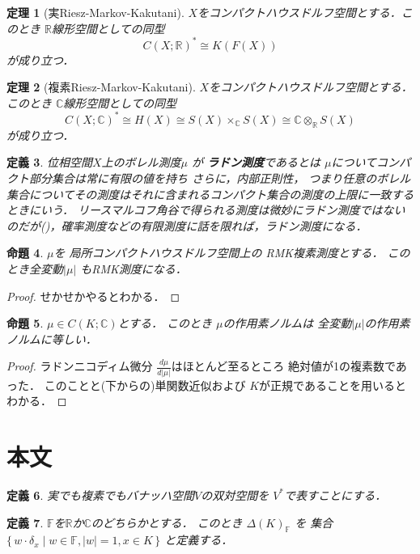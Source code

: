 \documentclass[leqno, a4paper, 12pt]{jsarticle}
\newtheorem{thm}{定理}
\newtheorem{prop}[thm]{命題}
\newtheorem{df}[thm]{定義}
\newcommand{\rr}{\mathbb{R}}
\newcommand{\cc}{\mathbb{C}}
\newcommand{\mydiracsetq}[2]{\Delta(#1)_{#2}}
\newcommand{\mygenf}{\mathbb{F}}
\newcommand{\mydirac}[1]{\delta_{#1}}
\begin{document}
\begin{thm}[実Riesz-Markov-Kakutani]
$X$をコンパクトハウスドルフ空間とする．このとき
$\rr$線形空間としての同型
\[
C(X; \rr)^*\cong K(F(X))
\]
が成り立つ．
\end{thm}

\begin{thm}[複素Riesz-Markov-Kakutani]
$X$をコンパクトハウスドルフ空間とする．このとき
$\cc$線形空間としての同型
\[
C(X; \cc)^*\cong H(X)\cong S(X)\times_{\cc}S(X) \cong\cc\otimes_{\rr}S(X)
\]
が成り立つ．
\end{thm}



\begin{df}
位相空間$X$上のボレル測度$\mu$
が
\textbf{ラドン測度}であるとは
$\mu$についてコンパクト部分集合は常に有限の値を持ち
さらに，内部正則性，
つまり任意のボレル集合についてその測度はそれに含まれるコンパクト集合の測度の上限に一致するときにいう．
リースマルコフ角谷で得られる測度は微妙にラドン測度ではないのだが(\cite{dempa1}\cite{dempa2})，確率測度などの有限測度に話を限れば，ラドン測度になる．
\end{df}



\begin{prop}
$\mu$を
局所コンパクトハウスドルフ空間上の
RMK複素測度とする．
このとき全変動$|\mu|$
もRMK測度になる．
\end{prop}
\begin{proof}
せかせかやるとわかる．
\end{proof}


\begin{prop}
$\mu\in C(K; \cc)$とする．
このとき
$\mu$の作用素ノルムは
全変動$|\mu|$の作用素ノルムに等しい．
\end{prop}
\begin{proof}
ラドンニコディム微分
$\frac{d\mu}{d|\mu|}$はほとんど至るところ
絶対値が1の複素数であった．
このことと(下からの)単関数近似および
$K$が正規であることを用いるとわかる．
\end{proof}





\section{本文}
\begin{df}
実でも複素でもバナッハ空間$V$の双対空間を
$V^{*}$で表すことにする．
\end{df}

\begin{df}
$\mygenf$を$\rr$か$\cc$のどちらかとする．
このとき
$\mydiracsetq{K}{\mygenf}$
を
集合
$\{\, w \cdot \mydirac{x}\mid w\in \mygenf, |w|=1, x\in K\, \}$
と定義する．
\end{df}
\end{document}
